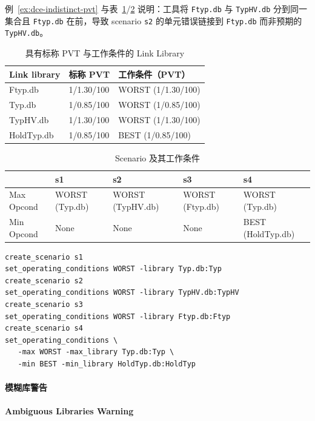例~\ref{ex:dce-indistinct-pvt} 与表~\ref{tab:dce-pvt-lib}/\ref{tab:dce-scen-op} 说明：工具将 \texttt{Ftyp.db} 与 \texttt{TypHV.db} 分到同一集合且 \texttt{Ftyp.db} 在前，导致 scenario \texttt{s2} 的单元错误链接到 \texttt{Ftyp.db} 而非预期的 \texttt{TypHV.db}。

\begin{table}[htbp]
\centering
\caption{具有标称 PVT 与工作条件的 Link Library}
\label{tab:dce-pvt-lib}
\small
\begin{tabular}{@{}lll@{}}
\toprule
Link library & 标称 PVT & 工作条件（PVT） \\
\midrule
Ftyp.db & 1/1.30/100 & WORST (1/1.30/100) \\
Typ.db & 1/0.85/100 & WORST (1/0.85/100) \\
TypHV.db & 1/1.30/100 & WORST (1/1.30/100) \\
HoldTyp.db & 1/0.85/100 & BEST (1/0.85/100) \\
\bottomrule
\end{tabular}
\end{table}

\begin{table}[htbp]
\centering
\caption{Scenario 及其工作条件}
\label{tab:dce-scen-op}
\small
\begin{tabular}{@{}lllll@{}}
\toprule
 & s1 & s2 & s3 & s4 \\
\midrule
Max Opcond & WORST (Typ.db) & WORST (TypHV.db) & WORST (Ftyp.db) & WORST (Typ.db) \\
Min Opcond & None & None & None & BEST (HoldTyp.db) \\
\bottomrule
\end{tabular}
\end{table}

\begin{lstlisting}[caption={导致链接问题的不清晰 PVT 值},label={ex:dce-indistinct-pvt}]
create_scenario s1
set_operating_conditions WORST -library Typ.db:Typ
create_scenario s2
set_operating_conditions WORST -library TypHV.db:TypHV
create_scenario s3
set_operating_conditions WORST -library Ftyp.db:Ftyp
create_scenario s4
set_operating_conditions \
   -max WORST -max_library Typ.db:Typ \
   -min BEST -min_library HoldTyp.db:HoldTyp
\end{lstlisting}

\paragraph{模糊库警告}
\paragraph*{Ambiguous Libraries Warning}

